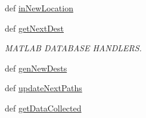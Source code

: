 \begin{DoxyCompactItemize}
\item 
def \hyperlink{namespacerobot_server_a26efd5684a33ead9a8c9e886293fba43}{in\+New\+Location}
\item 
def \hyperlink{namespacerobot_server_a8cdfcb641116b6b145bb35666f036c33}{get\+Next\+Dest}
\begin{DoxyCompactList}\small\item\em M\+A\+T\+L\+A\+B D\+A\+T\+A\+B\+A\+S\+E H\+A\+N\+D\+L\+E\+R\+S. \end{DoxyCompactList}\item 
def \hyperlink{namespacerobot_server_abf00341a56ede63a7a575df41ef9c242}{gen\+New\+Dests}
\item 
def \hyperlink{namespacerobot_server_a3df4158c8161e8a27a8ddcdcc3f838d9}{update\+Next\+Paths}
\item 
def \hyperlink{namespacerobot_server_a630be15680f4c3b1220c78142313dc34}{get\+Data\+Collected}
\end{DoxyCompactItemize}
